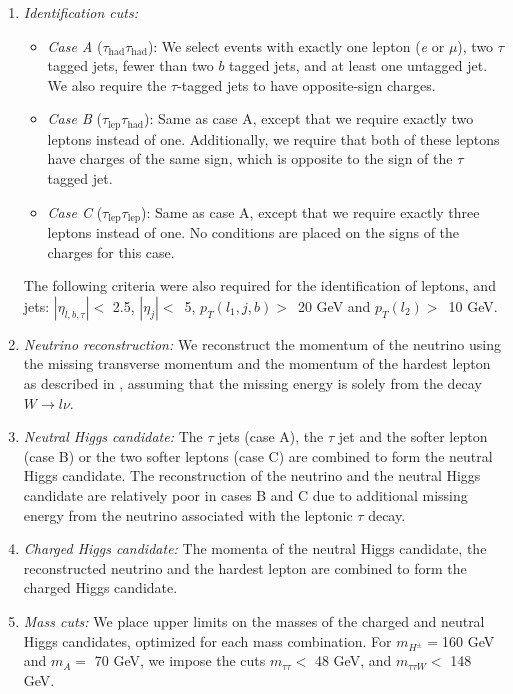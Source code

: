 \begin{enumerate}

\item \emph{Identification cuts:} 

  \begin{itemize}
    \item \emph{Case A} ($\tau_\text{had}\tau_\text{had}$): We select events with exactly one lepton (\emph{e} or $\mu$), two $\tau$ tagged jets, fewer than two $b$ tagged jets, and at least one untagged jet. We also require the $\tau$-tagged jets to have opposite-sign charges.

\item \emph{Case B} ($\tau_\text{lep}\tau_\text{had}$): Same as case A, except that we require exactly two leptons instead of one. Additionally, we require that both of these leptons have charges of the same sign, which is opposite to the sign of the $\tau$ tagged jet.
\item \emph{Case C} ($\tau_\text{lep}\tau_\text{lep}$): Same as case A, except that we require exactly three leptons instead of one. No conditions are placed on the signs of the charges for this case.
\end{itemize}
The following criteria were also required for the identification of leptons, and jets: $|\eta_{l,b,\tau}| <$ 2.5, $|\eta_{j}| <$~5, $p_{T}(l_1, j, b) >$~20 GeV and $p_{T}(l_{2}) >$~10 GeV.

\item \emph{Neutrino reconstruction:} 
We reconstruct the momentum of the neutrino using the missing transverse momentum and the momentum of the hardest lepton as described in \cite{Aad:2012ux}, assuming that the missing energy is solely from the decay $W\rightarrow l \nu$.

\item \emph{Neutral Higgs candidate:} The $\tau$ jets (case A), the $\tau$ jet and the softer lepton (case B) or the two softer leptons (case C) are combined to form the neutral Higgs candidate. The reconstruction of the neutrino and the neutral Higgs candidate are relatively poor in cases B and C due to additional missing energy from the neutrino associated with the leptonic $\tau$ decay. 

\item \emph{Charged Higgs candidate:} The momenta of the neutral Higgs candidate, the reconstructed neutrino and the hardest lepton are combined to form the charged Higgs candidate. 

\item \emph{Mass cuts:} We place upper limits on the masses of the charged and neutral Higgs candidates, optimized for each mass combination. For $m_{H^{\pm}}=$160 GeV and $m_{A}=$ 70 GeV, we impose the cuts $m_{\tau\tau} <$ 48 GeV, and $m_{\tau\tau W} <$ 148 GeV.


\end{enumerate}
